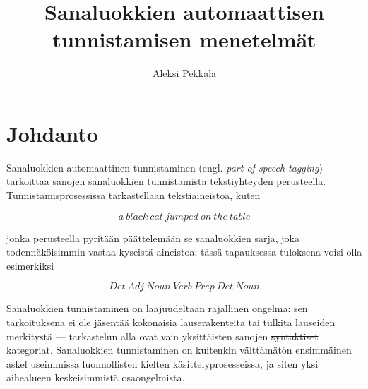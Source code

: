 \documentclass[utf8,bachelor,manualbib]{gradu3}
\providecommand{\DIFaddtex}[1]{{\protect\color{blue}\uwave{#1}}} %
\providecommand{\DIFdeltex}[1]{{\protect\color{red}\sout{#1}}}                      %
\providecommand{\DIFaddbegin}{} %
\providecommand{\DIFaddend}{} %
\providecommand{\DIFdelbegin}{} %
\providecommand{\DIFdelend}{} %
\providecommand{\DIFadd}[1]{\texorpdfstring{\DIFaddtex{#1}}{#1}} %
\providecommand{\DIFdel}[1]{\texorpdfstring{\DIFdeltex{#1}}{}} %
\begin{document}
\title{Sanaluokkien automaattisen tunnistamisen menetelmät}


\DIFdelbegin %
\DIFdelend \DIFaddbegin {}
\DIFaddend {}

\author{Aleksi Pekkala}

\maketitle

\mainmatter


\chapter{Johdanto}


Sanaluokkien automaattinen tunnistaminen (engl. \emph{part-of-speech tagging}) tarkoittaa sanojen sanaluokkien tunnistamista tekstiyhteyden perusteella.  Tunnistamisprosessissa tarkastellaan tekstiaineistoa, kuten

\[a\:black\:cat\:jumped\:on\:the\:table\]

jonka perusteella pyritään päättelemään se sanaluokkien sarja, joka todennäköisimmin vastaa kyseistä aineistoa; tässä tapauksessa tuloksena voisi olla esimerkiksi

\[Det\:Adj\:Noun\:Verb\:Prep\:Det\:Noun\]

Sanaluokkien tunnistaminen on laajuudeltaan rajallinen ongelma: sen tarkoituksena ei ole jäsentää kokonaisia lauserakenteita tai tulkita lauseiden merkitystä --- tarkastelun alla ovat vain yksittäisten sanojen \DIFdelbegin \DIFdel{syntaktiset }\DIFdelend \DIFaddbegin \DIFadd{leksikaaliset }\DIFaddend kategoriat. Sanaluokkien tunnistaminen on kuitenkin välttämätön ensimmäinen askel useimmissa luonnollisten kielten käsittelyprosesseissa, ja siten yksi aihealueen keskeisimmistä osaongelmista.
\end{document}

